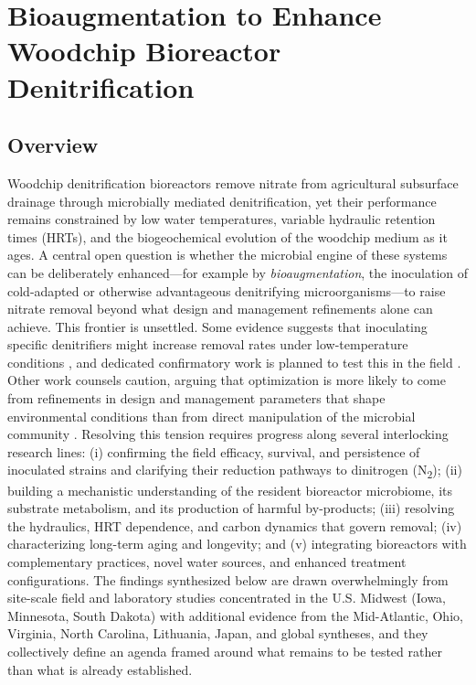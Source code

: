 \documentclass[11pt]{article}
\begin{document}
\section*{Bioaugmentation to Enhance Woodchip Bioreactor Denitrification}

\subsection{Overview}
Woodchip denitrification bioreactors remove nitrate from agricultural subsurface drainage through microbially mediated denitrification, yet their performance remains constrained by low water temperatures, variable hydraulic retention times (HRTs), and the biogeochemical evolution of the woodchip medium as it ages. A central open question is whether the microbial engine of these systems can be deliberately enhanced---for example by \emph{bioaugmentation}, the inoculation of cold-adapted or otherwise advantageous denitrifying microorganisms---to raise nitrate removal beyond what design and management refinements alone can achieve. This frontier is unsettled. Some evidence suggests that inoculating specific denitrifiers might increase removal rates under low-temperature conditions \parencite{Jang2019}, and dedicated confirmatory work is planned to test this in the field \parencite{Anderson2020}. Other work counsels caution, arguing that optimization is more likely to come from refinements in design and management parameters that shape environmental conditions than from direct manipulation of the microbial community \parencite{Hathaway2015}. Resolving this tension requires progress along several interlocking research lines: (i) confirming the field efficacy, survival, and persistence of inoculated strains and clarifying their reduction pathways to dinitrogen (N\textsubscript{2}); (ii) building a mechanistic understanding of the resident bioreactor microbiome, its substrate metabolism, and its production of harmful by-products; (iii) resolving the hydraulics, HRT dependence, and carbon dynamics that govern removal; (iv) characterizing long-term aging and longevity; and (v) integrating bioreactors with complementary practices, novel water sources, and enhanced treatment configurations. The findings synthesized below are drawn overwhelmingly from site-scale field and laboratory studies concentrated in the U.S. Midwest (Iowa, Minnesota, South Dakota) with additional evidence from the Mid-Atlantic, Ohio, Virginia, North Carolina, Lithuania, Japan, and global syntheses, and they collectively define an agenda framed around what remains to be tested rather than what is already established.
\end{document}
